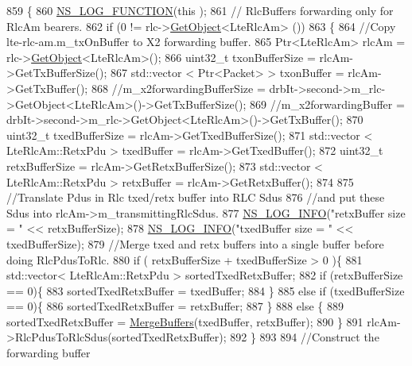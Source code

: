 \begin{DoxyCode}
859 \{
860   \hyperlink{log-macros-disabled_8h_a90b90d5bad1f39cb1b64923ea94c0761}{NS\_LOG\_FUNCTION}(\textcolor{keyword}{this} );
861         \textcolor{comment}{// RlcBuffers forwarding only for RlcAm bearers.}
862   \textcolor{keywordflow}{if} (0 != rlc->\hyperlink{classns3_1_1Object_a13e18c00017096c8381eb651d5bd0783}{GetObject}<LteRlcAm> ())
863   \{
864     \textcolor{comment}{//Copy lte-rlc-am.m\_txOnBuffer to X2 forwarding buffer.}
865     Ptr<LteRlcAm> rlcAm = rlc->\hyperlink{classns3_1_1Object_a13e18c00017096c8381eb651d5bd0783}{GetObject}<LteRlcAm>();
866     uint32\_t txonBufferSize = rlcAm->GetTxBufferSize();
867     std::vector < Ptr<Packet> > txonBuffer = rlcAm->GetTxBuffer();
868     \textcolor{comment}{//m\_x2forwardingBufferSize =  drbIt->second->m\_rlc->GetObject<LteRlcAm>()->GetTxBufferSize();}
869     \textcolor{comment}{//m\_x2forwardingBuffer = drbIt->second->m\_rlc->GetObject<LteRlcAm>()->GetTxBuffer();}
870     uint32\_t txedBufferSize = rlcAm->GetTxedBufferSize();
871     std::vector < LteRlcAm::RetxPdu > txedBuffer = rlcAm->GetTxedBuffer();
872     uint32\_t retxBufferSize = rlcAm->GetRetxBufferSize();
873     std::vector < LteRlcAm::RetxPdu > retxBuffer = rlcAm->GetRetxBuffer();
874     
875     \textcolor{comment}{//Translate Pdus in Rlc txed/retx buffer into RLC Sdus}
876     \textcolor{comment}{//and put these Sdus into rlcAm->m\_transmittingRlcSdus.}
877     \hyperlink{group__logging_gafbd73ee2cf9f26b319f49086d8e860fb}{NS\_LOG\_INFO}(\textcolor{stringliteral}{"retxBuffer size = "} << retxBufferSize);
878     \hyperlink{group__logging_gafbd73ee2cf9f26b319f49086d8e860fb}{NS\_LOG\_INFO}(\textcolor{stringliteral}{"txedBuffer size = "} << txedBufferSize);
879     \textcolor{comment}{//Merge txed and retx buffers into a single buffer before doing RlcPdusToRlc.}
880     \textcolor{keywordflow}{if} ( retxBufferSize + txedBufferSize > 0 )\{
881       std::vector< LteRlcAm::RetxPdu > sortedTxedRetxBuffer;
882       \textcolor{keywordflow}{if} (retxBufferSize == 0)\{
883         sortedTxedRetxBuffer = txedBuffer;
884       \}
885       \textcolor{keywordflow}{else} \textcolor{keywordflow}{if} (txedBufferSize == 0)\{
886         sortedTxedRetxBuffer = retxBuffer;
887       \}
888       \textcolor{keywordflow}{else} \{
889         sortedTxedRetxBuffer = \hyperlink{classns3_1_1UeManager_aa35d9d1c4f3019583f782373d9e428a1}{MergeBuffers}(txedBuffer, retxBuffer);
890       \}
891       rlcAm->RlcPdusToRlcSdus(sortedTxedRetxBuffer);  
892     \}
893 
894     \textcolor{comment}{//Construct the forwarding buffer}

\end{DoxyCode}
